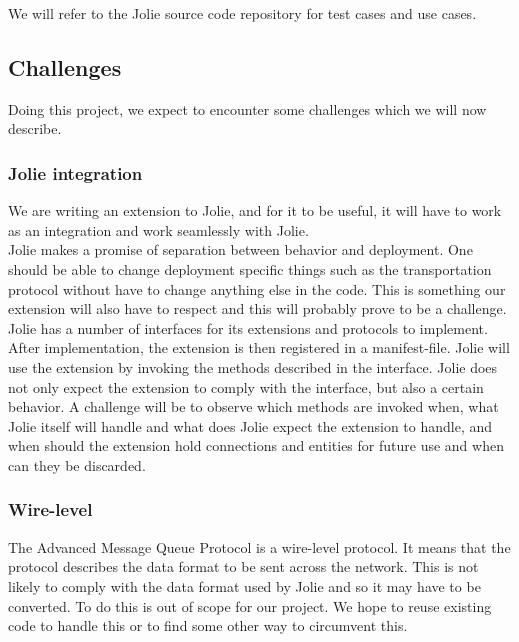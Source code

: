 We will refer to the Jolie source code repository for test cases and use cases.
\subsection{Challenges}
Doing this project, we expect to encounter some challenges which we will now describe.
\subsubsection{Jolie integration}
We are writing an extension to Jolie, and for it to be useful, it will have to work as an integration and work seamlessly with Jolie.\\
Jolie makes a promise of separation between behavior and deployment. One should be able to change deployment specific things such as the transportation protocol without have to change anything else in the code. This is something our extension will also have to respect and this will probably prove to be a challenge.\\
Jolie has a number of interfaces for its extensions and protocols to implement. After implementation, the extension is then registered in a manifest-file. Jolie will use the extension by invoking the methods described in the interface. Jolie does not only expect the extension to comply with the interface, but also a certain behavior. A challenge will be to observe which methods are invoked when, what Jolie itself will handle and what does Jolie expect the extension to handle, and when should the extension hold connections and entities for future use and when can they be discarded.
\subsubsection{Wire-level}
The Advanced Message Queue Protocol is a wire-level protocol. It means that the protocol describes the data format to be sent across the network. This is not likely to comply with the data format used by Jolie and so it may have to be converted. To do this is out of scope for our project. We hope to reuse existing code to handle this or to find some other way to circumvent this.
